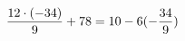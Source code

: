 \documentclass[preview]{standalone}
\begin{document}
\begin{align*}
\special{dvisvgm:raw <g id='unique000'>}\frac{12 \cdot (-34)}{9} + 78 = 10 - 6 (- \frac{34}{9})\special{dvisvgm:raw </g>}
\end{align*}
\end{document}
